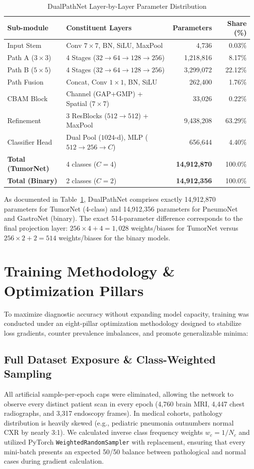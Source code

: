 \documentclass[conference]{IEEEtran}
\begin{document}
\begin{table}[t]
\caption{DualPathNet Layer-by-Layer Parameter Distribution}
\label{tab:params}
\centering
\begin{tabular}{llrr}
\toprule
\textbf{Sub-module} & \textbf{Constituent Layers} & \textbf{Parameters} & \textbf{Share (\%)} \\
\midrule
Input Stem & Conv $7\times 7$, BN, SiLU, MaxPool & 4,736 & 0.03\% \\
Path A ($3\times 3$) & 4 Stages ($32\to 64\to 128\to 256$) & 1,218,816 & 8.17\% \\
Path B ($5\times 5$) & 4 Stages ($32\to 64\to 128\to 256$) & 3,299,072 & 22.12\% \\
Path Fusion & Concat, Conv $1\times 1$, BN, SiLU & 262,400 & 1.76\% \\
CBAM Block & Channel (GAP+GMP) + Spatial ($7\times 7$) & 33,026 & 0.22\% \\
Refinement & 3 ResBlocks ($512\to 512$) + MaxPool & 9,438,208 & 63.29\% \\
Classifier Head & Dual Pool ($1024$-d), MLP ($512\to 256\to C$) & 656,644 & 4.40\% \\
\midrule
\textbf{Total (TumorNet)} & 4 classes ($C=4$) & \textbf{14,912,870} & 100.0\% \\
\textbf{Total (Binary)} & 2 classes ($C=2$) & \textbf{14,912,356} & 100.0\% \\
\bottomrule
\end{tabular}
\end{table}

As documented in Table~\ref{tab:params}, DualPathNet comprises exactly 14,912,870 parameters for TumorNet (4-class) and 14,912,356 parameters for PneumoNet and GastroNet (binary). The exact 514-parameter difference corresponds to the final projection layer: $256\times 4+4 = 1{,}028$ weights/biases for TumorNet versus $256\times 2+2 = 514$ weights/biases for the binary models.

\section{Training Methodology \& Optimization Pillars}
To maximize diagnostic accuracy without expanding model capacity, training was conducted under an eight-pillar optimization methodology designed to stabilize loss gradients, counter prevalence imbalances, and promote generalizable minima:

\subsection{Full Dataset Exposure \& Class-Weighted Sampling}
All artificial sample-per-epoch caps were eliminated, allowing the network to observe every distinct patient scan in every epoch (4,760 brain MRI, 4,447 chest radiographs, and 3,317 endoscopy frames). In medical cohorts, pathology distribution is heavily skewed (e.g., pediatric pneumonia outnumbers normal CXR by nearly 3:1). We calculated inverse class frequency weights $w_c = 1 / N_c$ and utilized PyTorch \texttt{WeightedRandomSampler} with replacement, ensuring that every mini-batch presents an expected 50/50 balance between pathological and normal cases during gradient calculation.
\end{document}
